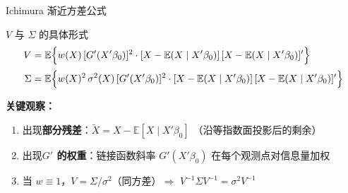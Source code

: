 \documentclass[aspectratio=169, 10pt]{beamer}
\begin{document}
\begin{frame}{Ichimura 渐近方差公式}

  \begin{definitionbox}{{$V$ 与 $\Sigma$ 的具体形式}}
    \begin{align*}
    V &= \mathbb{E}\Bigl\{w(X)\,[G'(X'\beta_0)]^2 \cdot
    [X - \mathbb{E}(X \mid X'\beta_0)]\,[X - \mathbb{E}(X \mid X'\beta_0)]'\Bigr\} \\[2pt]
    \Sigma &= \mathbb{E}\Bigl\{w(X)^2\,\sigma^2(X)\,[G'(X'\beta_0)]^2 \cdot
    [X - \mathbb{E}(X \mid X'\beta_0)]\,[X - \mathbb{E}(X \mid X'\beta_0)]'\Bigr\}
    \end{align*}
  \end{definitionbox}

  \begin{highlightbox}
    \textbf{关键观察：}
    \begin{enumerate}\setlength{\itemsep}{1pt}
      \item 出现\textbf{部分残差}：$\tilde X = X - \mathbb{E}[X \mid X'\beta_0]$
      （沿等指数面投影后的剩余）
      \item 出现\textbf{$G'$ 的权重}：链接函数斜率 $G'(X'\beta_0)$
      在每个观测点对信息量加权
      \item 当 $w \equiv 1$，$V = \Sigma / \sigma^2$（同方差）$\Rightarrow$
      $V^{-1}\Sigma V^{-1} = \sigma^2 V^{-1}$
    \end{enumerate}
  \end{highlightbox}

  \hypertarget{main-c7}{}
  \hfill{\scriptsize\hyperlink{proof-c7}{}}

\end{frame}
\end{document}
